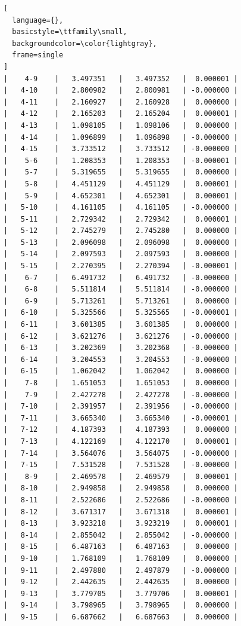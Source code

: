 \documentclass{article}
\begin{document}
\begin{lstlisting}[
  language={},
  basicstyle=\ttfamily\small,
  backgroundcolor=\color{lightgray},
  frame=single
]
|    4-9    |   3.497351   |   3.497352   |  0.000001 |
|   4-10    |   2.800982   |   2.800981   | -0.000000 |
|   4-11    |   2.160927   |   2.160928   |  0.000000 |
|   4-12    |   2.165203   |   2.165204   |  0.000001 |
|   4-13    |   1.098105   |   1.098106   |  0.000000 |
|   4-14    |   1.096899   |   1.096898   | -0.000000 |
|   4-15    |   3.733512   |   3.733512   | -0.000000 |
|    5-6    |   1.208353   |   1.208353   | -0.000001 |
|    5-7    |   5.319655   |   5.319655   |  0.000000 |
|    5-8    |   4.451129   |   4.451129   |  0.000001 |
|    5-9    |   4.652301   |   4.652301   |  0.000001 |
|   5-10    |   4.161105   |   4.161105   | -0.000000 |
|   5-11    |   2.729342   |   2.729342   |  0.000001 |
|   5-12    |   2.745279   |   2.745280   |  0.000000 |
|   5-13    |   2.096098   |   2.096098   |  0.000000 |
|   5-14    |   2.097593   |   2.097593   |  0.000000 |
|   5-15    |   2.270395   |   2.270394   | -0.000001 |
|    6-7    |   6.491732   |   6.491732   | -0.000000 |
|    6-8    |   5.511814   |   5.511814   | -0.000000 |
|    6-9    |   5.713261   |   5.713261   |  0.000000 |
|   6-10    |   5.325566   |   5.325565   | -0.000001 |
|   6-11    |   3.601385   |   3.601385   |  0.000000 |
|   6-12    |   3.621276   |   3.621276   | -0.000000 |
|   6-13    |   3.202369   |   3.202368   | -0.000000 |
|   6-14    |   3.204553   |   3.204553   | -0.000000 |
|   6-15    |   1.062042   |   1.062042   |  0.000000 |
|    7-8    |   1.651053   |   1.651053   |  0.000000 |
|    7-9    |   2.427278   |   2.427278   | -0.000000 |
|   7-10    |   2.391957   |   2.391956   | -0.000000 |
|   7-11    |   3.665340   |   3.665340   | -0.000001 |
|   7-12    |   4.187393   |   4.187393   |  0.000000 |
|   7-13    |   4.122169   |   4.122170   |  0.000001 |
|   7-14    |   3.564076   |   3.564075   | -0.000000 |
|   7-15    |   7.531528   |   7.531528   | -0.000000 |
|    8-9    |   2.469578   |   2.469579   |  0.000001 |
|   8-10    |   2.949858   |   2.949858   |  0.000000 |
|   8-11    |   2.522686   |   2.522686   | -0.000000 |
|   8-12    |   3.671317   |   3.671318   |  0.000001 |
|   8-13    |   3.923218   |   3.923219   |  0.000001 |
|   8-14    |   2.855042   |   2.855042   | -0.000000 |
|   8-15    |   6.487163   |   6.487163   |  0.000000 |
|   9-10    |   1.768109   |   1.768109   |  0.000000 |
|   9-11    |   2.497880   |   2.497879   | -0.000000 |
|   9-12    |   2.442635   |   2.442635   |  0.000000 |
|   9-13    |   3.779705   |   3.779706   |  0.000001 |
|   9-14    |   3.798965   |   3.798965   |  0.000000 |
|   9-15    |   6.687662   |   6.687663   |  0.000000 |

\end{lstlisting}
\end{document}

